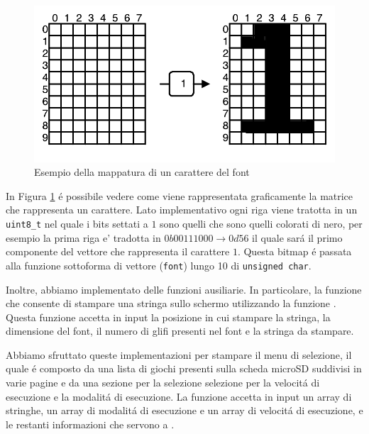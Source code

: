 \documentclass[a4paper]{article}
\begin{document}
\begin{figure}[h!t]
    \begin{center}
        \includegraphics[scale=0.5]{./figures/matrix_font.pdf}
    \end{center}
    \caption{Esempio della mappatura di un carattere del font}
    \label{fig:matrix_font}
\end{figure}

In Figura \ref{fig:matrix_font} \'e possibile vedere come viene rappresentata graficamente la matrice che rappresenta un carattere. Lato implementativo ogni riga viene tratotta in un \texttt{uint8\_t} nel quale i bits settati a $1$ sono quelli che sono quelli colorati di nero, per esempio la prima riga e' tradotta in $0b00111000 \rightarrow 0d56$ il quale sar\'a il primo componente del vettore che rappresenta il carattere $1$. Questa bitmap \'e passata alla funzione {} sottoforma di vettore (\texttt{font}) lungo 10 di \texttt{unsigned char}.

Inoltre, abbiamo implementato delle funzioni ausiliarie. In particolare, la funzione {} che consente di stampare una stringa sullo schermo utilizzando la funzione {}. Questa funzione accetta in input la posizione in cui stampare la stringa, la dimensione del font, il numero di glifi presenti nel font e la stringa da stampare.

Abbiamo sfruttato queste implementazioni per stampare il menu di selezione, il quale é composto da una lista di giochi presenti sulla scheda microSD suddivisi in varie pagine e da una sezione per la selezione selezione per la velocitá di esecuzione e la modalitá di esecuzione. La funzione accetta in input un array di stringhe, un array di modalitá di esecuzione e un array di velocitá di esecuzione, e le restanti informazioni che servono a {}.
\end{document}
